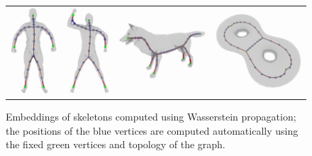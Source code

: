 \begin{figure}[t]\centering
\begin{tabular}{c@{}c@{}c@{}c}
\includegraphics[height=.3\linewidth]{figures/skeletons/human_skeleton_cropped.pdf}&
\includegraphics[height=.3\linewidth]{figures/skeletons/human_skeleton2_cropped.pdf}&
\includegraphics[height=.25\linewidth]{figures/skeletons/wolf_skeleton_cropped.pdf}&
\includegraphics[height=.25\linewidth]{figures/skeletons/double_torus_skeleton_cropped.pdf}
\end{tabular}
\vspace{-2mm}
\caption{Embeddings of skeletons computed using Wasserstein propagation; the positions of the blue vertices are computed automatically using the fixed green vertices and topology of the graph.\vspace{-.2in}}\label{fig:skeleton}
\end{figure}

\vspace{-2mm}
